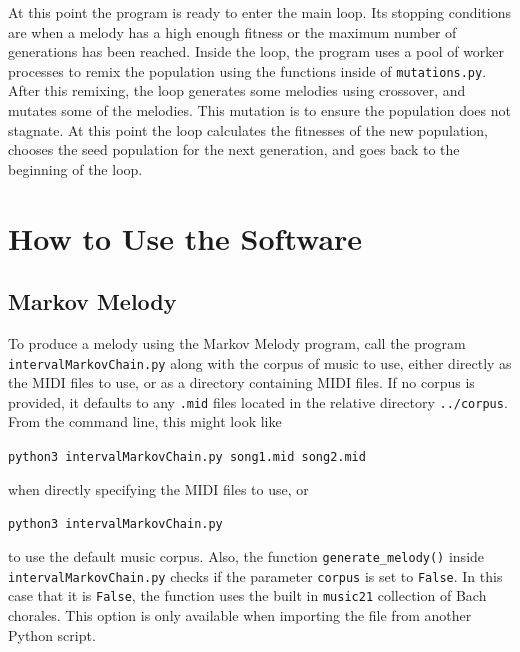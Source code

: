 At this point the program is ready to enter the main loop.
Its stopping conditions are when a melody has a high enough fitness or the maximum number of generations has been reached.
Inside the loop, the program uses a pool of worker processes to remix the population using the functions inside of \texttt{mutations.py}.
After this remixing, the loop generates some melodies using crossover, and mutates some of the melodies.
This mutation is to ensure the population does not stagnate.
At this point the loop calculates the fitnesses of the new population, chooses the seed population for the next generation, and goes back to the beginning of the loop.

\section{How to Use the Software} \label{software:howtouse}

\subsection{Markov Melody} \label{software:howtouse:markov}

To produce a melody using the Markov Melody program, call the program \texttt{intervalMarkovChain.py} along with the corpus of music to use, either directly as the MIDI files to use, or as a directory containing MIDI files.
If no corpus is provided, it defaults to any \texttt{.mid} files located in the relative directory \texttt{../corpus}.
From the command line, this might look like

\texttt{python3 intervalMarkovChain.py song1.mid song2.mid}

\noindent when directly specifying the MIDI files to use, or

\texttt{python3 intervalMarkovChain.py}

\noindent to use the default music corpus.
Also, the function \texttt{generate\_melody()} inside \texttt{intervalMarkovChain.py} checks if the parameter \texttt{corpus} is set to \texttt{False}.
In this case that it is \texttt{False}, the function uses the built in \texttt{music21} collection of Bach chorales.
This option is only available when importing the file from another Python script.


